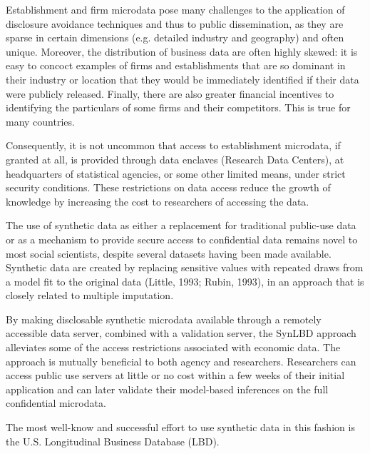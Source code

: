 Establishment and firm microdata pose many challenges to the application of disclosure avoidance techniques and thus to public dissemination, as they are sparse in certain dimensions (e.g. detailed industry and geography) and often unique. Moreover, the distribution of business data are often highly skewed: it is easy to concoct examples of firms and establishments that are so dominant in their industry or location that they would be immediately identified if their data were publicly released. Finally, there are also greater financial incentives to identifying the particulars of some firms and their competitors. This is true for many countries. 

Consequently, it is not uncommon that access to establishment microdata, if granted at all, is provided through data enclaves (Research Data Centers), at headquarters of statistical agencies, or some other limited means, under strict security conditions. These restrictions on data access reduce the growth of knowledge by increasing the cost to researchers of accessing the data.

The use of synthetic data as either a replacement for traditional public-use data or as a mechanism to provide secure access to confidential data remains novel to most social scientists, despite several datasets having been made available. Synthetic data are created by replacing sensitive values with repeated draws from a model fit to the original data (Little, 1993; Rubin, 1993), in an approach that is closely related to multiple imputation.

By making disclosable synthetic microdata available through a remotely accessible data server, combined with a validation server, the SynLBD approach alleviates some of the access restrictions associated with economic data. The approach is mutually beneficial to both agency and researchers. Researchers can access public use servers at little or no cost within a few weeks of their initial application and can later validate their model-based inferences on the full confidential microdata.

The most well-know and successful effort to use synthetic data in this fashion is the U.S. Longitudinal Business Database (LBD).  


